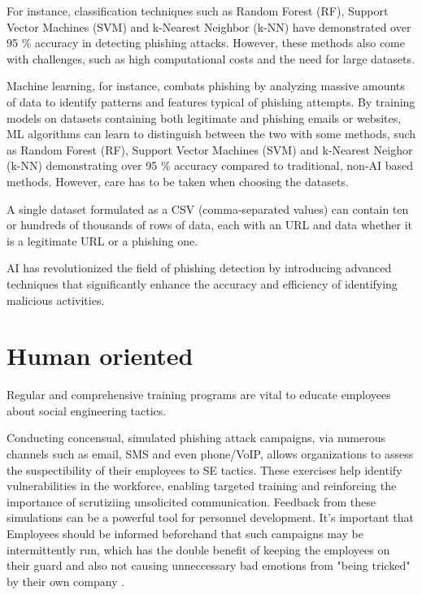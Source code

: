 For instance, classification techniques such as Random Forest (RF), Support Vector Machines (SVM) and k-Nearest Neighbor (k-NN) have demonstrated over 95 \% accuracy in detecting phishing attacks. However, these methods also come with challenges, such as high computational costs and the need for large datasets.

Machine learning, for instance, combats phishing by analyzing massive amounts of data to identify patterns and features typical of phishing attempts. By training models on datasets containing both legitimate and phishing emails or websites, ML algorithms can learn to distinguish between the two with some methods, such as Random Forest (RF), Support Vector Machines (SVM) and k-Nearest Neighor (k-NN) demonstrating over 95 \% accuracy compared to traditional, non-AI based methods. However, care has to be taken when choosing the datasets.

A single dataset formulated as a CSV (comma-separated values) can contain ten or hundreds of thousands of rows of data, each with an URL and data whether it is a legitimate URL or a phishing one.



AI has revolutionized the field of phishing detection by introducing advanced techniques that significantly enhance the accuracy and efficiency of identifying malicious activities.




\section{Human oriented}
\begin{comment}
    
    - The best defense against SE attacks is an educated, conscious user
    - User education should be continuous and not a one-off event

\end{comment}

Regular and comprehensive training programs are vital to educate employees about social engineering tactics.

Conducting concensual, simulated phishing attack campaigns, via numerous channels such as email, SMS and even phone/VoIP, allows organizations to assess the suspectibility of their employees to SE tactics. These exercises help identify vulnerabilities in the workforce, enabling targeted training and reinforcing the importance of scrutiziing unsolicited communication. Feedback from these simulations can be a powerful tool for personnel development. It's important that Employees should be informed beforehand that such campaigns may be intermittently run, which has the double benefit of keeping the employees on their guard and also not causing unneccessary bad emotions from "being tricked" by their own company \citep{hadnagySocialEngineering2018, mitnickArtDeceptionControlling2003}.

